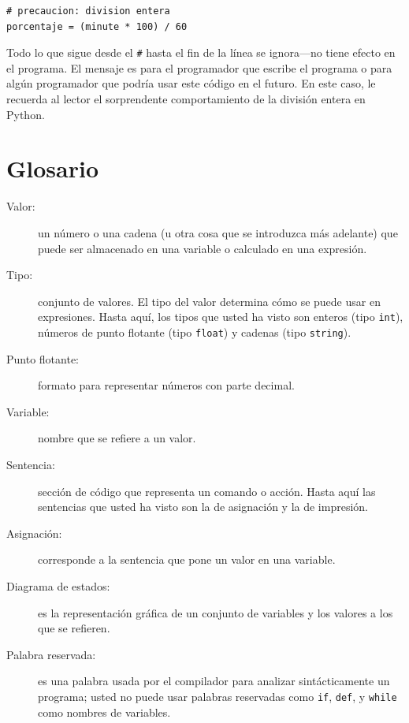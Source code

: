 \beforeverb
\begin{verbatim}
# precaucion: division entera
porcentaje = (minute * 100) / 60   
\end{verbatim}
\afterverb
%
Todo lo que sigue desde el \texttt{\#} hasta el fin de la línea se ignora---no 
tiene efecto en el programa. El mensaje es para el programador que escribe
el programa o para algún programador que podría usar este código en el futuro.
En este caso, le recuerda al lector el sorprendente comportamiento de la 
división entera en Python.


\section{Glosario}

\begin{description}

\item[Valor:]  un número o una cadena (u otra cosa que se introduzca más adelante) que puede ser almacenado en una variable o calculado en una expresión.

\item[Tipo:]  conjunto de valores.  El tipo del valor determina cómo se puede usar en expresiones.  Hasta aquí, los tipos que usted ha visto son enteros (tipo \texttt{int}), números de punto flotante (tipo \texttt{float})
y cadenas (tipo \texttt{string}).

\item[Punto flotante:] formato para representar números con parte decimal.

\item[Variable:]  nombre que se refiere a un valor.

\item[Sentencia:]  sección de código que representa un comando o acción. 
Hasta aquí las sentencias que usted ha visto son la de asignación y 
la de impresión.

\item[Asignación:]  corresponde a la sentencia que pone un valor en una variable.

\item[Diagrama de estados:]  es la representación gráfica de un conjunto de
variables y los valores a los que se refieren.

\item[Palabra reservada:]  es una palabra usada por el compilador
para analizar sintácticamente un programa; usted no puede usar palabras reservadas 
como \texttt{if}, \texttt{def}, y \texttt{while} como nombres de variables.


\end{description}
